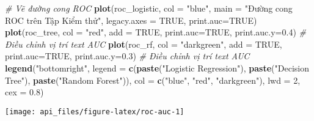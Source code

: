 \documentclass[
]{article}
\newenvironment{Shaded}{\begin{snugshade}}{\end{snugshade}}
\newcommand{\AttributeTok}[1]{\textcolor[rgb]{0.13,0.29,0.53}{#1}}
\newcommand{\CommentTok}[1]{\textcolor[rgb]{0.56,0.35,0.01}{\textit{#1}}}
\newcommand{\ConstantTok}[1]{\textcolor[rgb]{0.56,0.35,0.01}{#1}}
\newcommand{\DecValTok}[1]{\textcolor[rgb]{0.00,0.00,0.81}{#1}}
\newcommand{\FloatTok}[1]{\textcolor[rgb]{0.00,0.00,0.81}{#1}}
\newcommand{\FunctionTok}[1]{\textcolor[rgb]{0.13,0.29,0.53}{\textbf{#1}}}
\newcommand{\NormalTok}[1]{#1}
\newcommand{\OtherTok}[1]{\textcolor[rgb]{0.56,0.35,0.01}{#1}}
\newcommand{\SpecialCharTok}[1]{\textcolor[rgb]{0.81,0.36,0.00}{\textbf{#1}}}
\newcommand{\StringTok}[1]{\textcolor[rgb]{0.31,0.60,0.02}{#1}}
\begin{document}
\begin{Shaded}
\begin{Highlighting}[]
\CommentTok{\# Vẽ đường cong ROC}
\FunctionTok{plot}\NormalTok{(roc\_logistic, }\AttributeTok{col =} \StringTok{"blue"}\NormalTok{, }\AttributeTok{main =} \StringTok{"Đường cong ROC trên Tập Kiểm thử"}\NormalTok{, }\AttributeTok{legacy.axes =} \ConstantTok{TRUE}\NormalTok{, }\AttributeTok{print.auc=}\ConstantTok{TRUE}\NormalTok{)}
\FunctionTok{plot}\NormalTok{(roc\_tree, }\AttributeTok{col =} \StringTok{"red"}\NormalTok{, }\AttributeTok{add =} \ConstantTok{TRUE}\NormalTok{, }\AttributeTok{print.auc=}\ConstantTok{TRUE}\NormalTok{, }\AttributeTok{print.auc.y=}\FloatTok{0.4}\NormalTok{) }\CommentTok{\# Điều chỉnh vị trí text AUC}
\FunctionTok{plot}\NormalTok{(roc\_rf, }\AttributeTok{col =} \StringTok{"darkgreen"}\NormalTok{, }\AttributeTok{add =} \ConstantTok{TRUE}\NormalTok{, }\AttributeTok{print.auc=}\ConstantTok{TRUE}\NormalTok{, }\AttributeTok{print.auc.y=}\FloatTok{0.3}\NormalTok{) }\CommentTok{\# Điều chỉnh vị trí text AUC}
\FunctionTok{legend}\NormalTok{(}\StringTok{"bottomright"}\NormalTok{, }
       \AttributeTok{legend =} \FunctionTok{c}\NormalTok{(}\FunctionTok{paste}\NormalTok{(}\StringTok{"Logistic Regression"}\NormalTok{),}
                  \FunctionTok{paste}\NormalTok{(}\StringTok{"Decision Tree"}\NormalTok{),}
                  \FunctionTok{paste}\NormalTok{(}\StringTok{"Random Forest"}\NormalTok{)),}
       \AttributeTok{col =} \FunctionTok{c}\NormalTok{(}\StringTok{"blue"}\NormalTok{, }\StringTok{"red"}\NormalTok{, }\StringTok{"darkgreen"}\NormalTok{), }
       \AttributeTok{lwd =} \DecValTok{2}\NormalTok{, }\AttributeTok{cex =} \FloatTok{0.8}\NormalTok{)}
\end{Highlighting}
\end{Shaded}

\begin{center}\texttt{[image: api\_files/figure-latex/roc-auc-1]} \end{center}

\begin{Shaded}
\end{Shaded}
\end{document}
